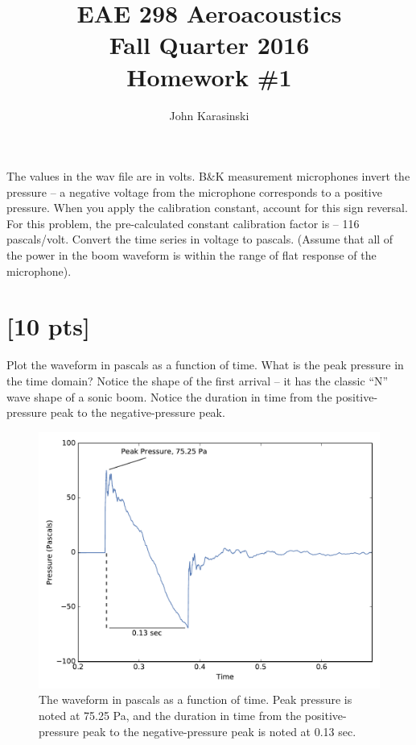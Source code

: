 \documentclass[onecolumn,10pt]{jhwhw}
\author{John Karasinski}
\title{EAE 298 Aeroacoustics \\ Fall Quarter 2016 \\ Homework \#1}
\begin{document}
\maketitle

\problem{[50 pts]} The values in the wav file are in volts. B\&K measurement microphones invert the pressure – a negative voltage from the microphone corresponds to a positive pressure. When you apply the calibration constant, account for this sign reversal. For this problem, the pre-calculated constant calibration factor is – 116 pascals/volt. Convert the time series in voltage to pascals. (Assume that all of the power in the boom waveform is within the range of flat response of the microphone).

\part{[10 pts]} Plot the waveform in pascals as a function of time. What is the peak pressure in the time domain? Notice the shape of the first arrival – it has the classic “N” wave shape of a sonic boom. Notice the duration in time from the positive-pressure peak to the negative-pressure peak.
\solution

\begin{figure}[h]
  \centering
  \includegraphics[height=0.5\textheight]{figs/Pascals_vs_Time.pdf}%
  \caption{The waveform in pascals as a function of time. Peak pressure is noted at 75.25 Pa, and the duration in time from the positive-pressure peak to the negative-pressure peak is noted at 0.13 sec.}%
\end{figure}
\end{document}
